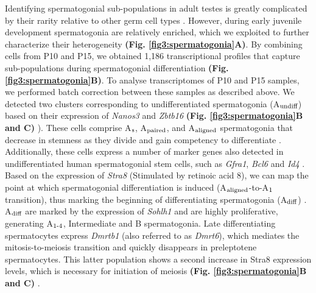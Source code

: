 Identifying spermatogonial sub-populations in adult testes is greatly complicated by their rarity relative to other germ cell types \citep{Lukassen2018}. However, during early juvenile development spermatogonia are relatively enriched, which we exploited to further characterize their heterogeneity \textbf{(Fig. \ref{fig3:spermatogonia}A)}. By combining cells from P10 and P15, we obtained 1,186 transcriptional profiles that capture sub-populations during spermatogonial differentiation \textbf{(Fig. \ref{fig3:spermatogonia}B)}. To analyse transcriptomes of P10 and P15 samples, we performed batch correction between these samples as described above. We detected two clusters corresponding to undifferentiated spermatogonia (A$_\textnormal{undiff}$) based on their expression of \textit{Nanos3} and \textit{Zbtb16} \textbf{(Fig. \ref{fig3:spermatogonia}B and C)} \citep{Buaas2004, Lolicato2008}). These cells comprise A$_\textnormal{s}$, A$_\textnormal{paired}$, and A$_\textnormal{aligned}$ spermatogonia that decrease in stemness as they divide and gain competency to differentiate \citep{Suzuki2012}. Additionally, these cells express a number of marker genes also detected in undifferentiated human spermatogonial stem cells, such as \textit{Gfra1}, \textit{Bcl6} and \textit{Id4} \citep{Guo2017}. Based on the expression of \textit{Stra8} (Stimulated by retinoic acid 8), we can map the point at which spermatogonial differentiation is induced (A$_\textnormal{aligned}$-to-A$_\textnormal{1}$ transition), thus marking the beginning of differentiating spermatogonia (A$_\textnormal{diff}$) \citep{Endo2015}. A$_\textnormal{diff}$ are marked by the expression of \textit{Sohlh1} \citep{Ballow2006} and are highly proliferative, generating A$_\textnormal{1-4}$, Intermediate and B spermatogonia. Late differentiating spermatocytes express \textit{Dmrtb1} (also referred to as \textit{Dmrt6}), which mediates the mitosis-to-meiosis transition and quickly disappears in preleptotene spermatocytes. This latter population shows a second increase in Stra8 expression levels, which is necessary for initiation of meiosis \textbf{(Fig. \ref{fig3:spermatogonia}B and C)} \citep{Anderson2008, Endo2015, Zhang2014}. 

\newpage

